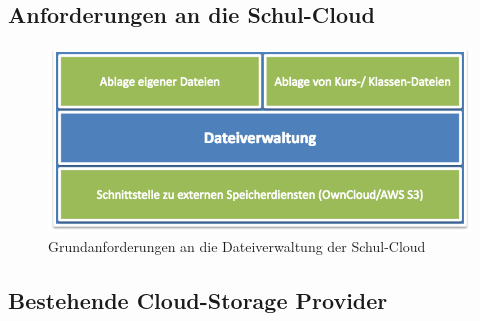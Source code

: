 \cite{survey:umfragedateiorganisationergebnisse}


\subsection{Anforderungen an die Schul-Cloud}

\begin{center}
	
	\begin{figure}[H]
		\begin{center}
			\includegraphics[width=0.8\linewidth]{images/AnforderungenDateiverwaltung}
			\caption[Caption for relatedWork]{Grundanforderungen an die Dateiverwaltung der Schul-Cloud\footnotemark}
			\label{fig:devices}
		\end{center}
	\end{figure}
\end{center}


\subsection{Bestehende Cloud-Storage Provider}


\clearpage
